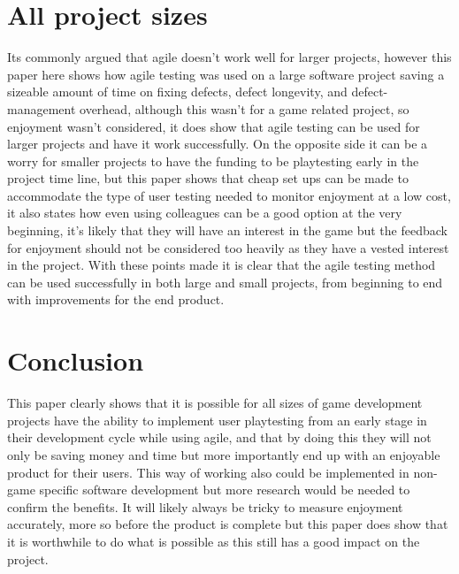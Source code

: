 \documentclass{scrartcl}
\begin{document}
	\section{All project sizes}
	Its commonly argued that agile doesn't work well for larger projects, however this paper here \cite{talby2006agile} shows how agile testing was used on a large software project saving a sizeable amount of time on fixing defects, defect longevity, and defect-management overhead, although this wasn't for a game related project, so enjoyment wasn't considered, it does show that agile testing can be used for larger projects and have it work successfully. On the opposite side it can be a worry for smaller projects to have the funding to be playtesting early in the project time line, but this paper \cite{moosajee2016games} shows that cheap set ups can be made to accommodate the type of user testing needed to monitor enjoyment at a low cost, it also states how even using colleagues can be a good option at the very beginning, it's likely that they will have an interest in the game but the feedback for enjoyment should not be considered too heavily as they have a vested interest in the project. With these points made it is clear that the agile testing method can be used successfully in both large and small projects, from beginning to end with improvements for the end product.
	
	
	\section{Conclusion}
	
	This paper clearly shows that it is possible for all sizes of game development projects have the ability to implement user playtesting from an early stage in their development cycle while using agile, and that by doing this they will not only be saving money and time but more importantly end up with an enjoyable product for their users. This way of working also could be implemented in non-game specific software development but more research would be needed to confirm the benefits. It will likely always be tricky to measure enjoyment accurately, more so before the product is complete but this paper does show that it is worthwhile to do what is possible as this still has a good impact on the project.
	
	
	
	
	
\end{document}
